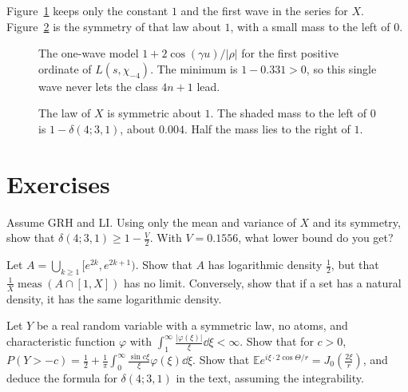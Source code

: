 Figure~\ref{fig:v15c13-wave} keeps only the constant \(1\) and the first wave in the series for \(X\). Figure~\ref{fig:v15c13-symmetry} is the symmetry of that law about \(1\), with a small mass to the left of \(0\).

\begin{figure}[ht]
\centering
{}
\caption{The one-wave model \(1+2\cos(\gamma u)/|\rho|\) for the first positive ordinate of \(L(s,\chi_{-4})\). The minimum is \(1-0.331>0\), so this single wave never lets the class \(4n+1\) lead.}
\label{fig:v15c13-wave}
\end{figure}

\begin{figure}[ht]
\centering
{}
\caption{The law of \(X\) is symmetric about \(1\). The shaded mass to the left of \(0\) is \(1-\delta(4;3,1)\), about \(0.004\). Half the mass lies to the right of \(1\).}
\label{fig:v15c13-symmetry}
\end{figure}

\section{Exercises}

\begin{exercise}[$\star$]\label{ex:chebbound}
Assume GRH and LI. Using only the mean and variance of $X$ and its symmetry, show that $\delta(4;3,1)\ge1-\frac V2$. With $V=0.1556$, what lower bound do you get?
\end{exercise}

\begin{exercise}[$\star$]\label{ex:logdensity}
Let $A=\bigcup_{k\ge1}[e^{2k},e^{2k+1})$. Show that $A$ has logarithmic density $\frac12$, but that $\frac1X\operatorname{meas}(A\cap[1,X])$ has no limit. Conversely, show that if a set has a natural density, it has the same logarithmic density.
\end{exercise}

\begin{exercise}[$\star\star$]\label{ex:gilpelaez}
Let $Y$ be a real random variable with a symmetric law, no atoms, and characteristic function $\varphi$ with $\int_1^\infty\frac{|\varphi(\xi)|}\xi\dd\xi<\infty$. Show that for $c>0$, $P(Y>-c)=\frac12+\frac1\pi\int_0^\infty\frac{\sin c\xi}\xi\varphi(\xi)\dd\xi$. Show that $\mathbb Ee^{i\xi\cdot2\cos\Theta/r}=J_0(\frac{2\xi}r)$, and deduce the formula for $\delta(4;3,1)$ in the text, assuming the integrability.
\end{exercise}

